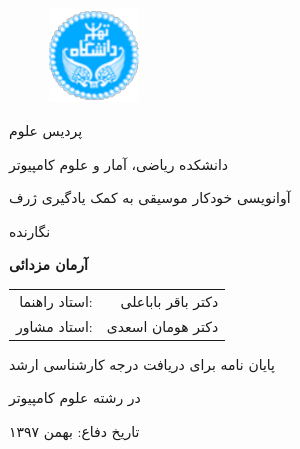 \begin{figure}
    \centering
    \includegraphics[height=2.5cm]{./statics/UT-Logo.pdf}
\end{figure}

\begin{center}
    پردیس علوم

    دانشکده ریاضی، آمار و علوم کامپیوتر
\end{center}

\vspace{1cm}

\begin{center}
    \huge{آوانویسی خودکار موسیقی به کمک یادگیری ژرف}
\end{center}

\vspace{1cm}

\begin{center}
    نگارنده
\end{center}
\begin{center}
    \textbf{آرمان مزدائی}
\end{center}

\begin{center}
    \begin{tabular}{rr}
        استاد راهنما:& دکتر باقر باباعلی
        \\
        استاد مشاور:& دکتر هومان اسعدی
    \end{tabular}
\end{center}

\vspace{3cm}
\begin{center}
    پایان نامه برای دریافت درجه کارشناسی ارشد

    در رشته علوم کامپیوتر
\end{center}

\begin{center}
تاریخ دفاع: بهمن ۱۳۹۷
\end{center}

\pagestyle{empty}
\pagenumbering{}
